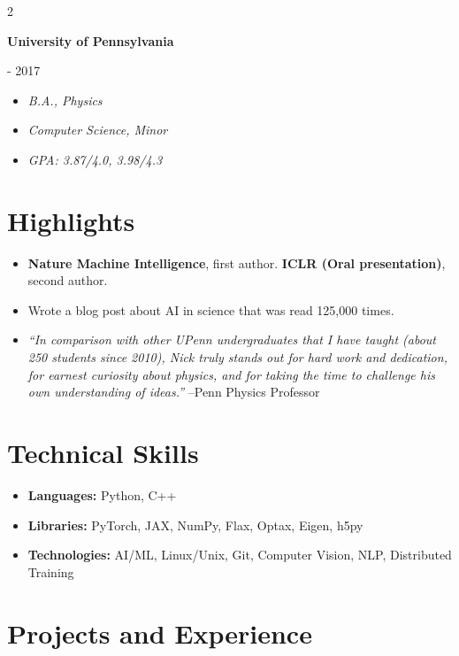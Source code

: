 \documentclass[10pt, letterpaper]{article}
\newenvironment{highlights}{
    \begin{itemize}[
        topsep=0.10 cm,
        parsep=0.10 cm,
        partopsep=0pt,
        itemsep=0pt,
        leftmargin=0.4 cm + 10pt
    ]
}{
    \end{itemize}
} %
\newenvironment{twocolentry}[2][]{
    \onecolentry
    \def\secondColumn{#2}
    \setcolumnwidth{\fill, 4.5 cm}
    \begin{paracol}{2}
}{
    \switchcolumn \raggedleft \secondColumn
    \end{paracol}
    \endonecolentry
} %
\begin{document}
\begin{twocolentry}{2013 - 2017}
    \textbf{University of Pennsylvania}
\end{twocolentry}
\begin{highlights}
    \item \textit{B.A., Physics}
    \item \textit{Computer Science, Minor}
    \item \textit{GPA: 3.87/4.0, 3.98/4.3}
\end{highlights}


\section{Highlights}

    \begin{highlights}
        \item \textbf{Nature Machine Intelligence}, first author. \textbf{ICLR (Oral presentation)}, second author. 
        \item Wrote a blog post about AI in science that was read 125,000 times.
        \item \textit{``In comparison with other UPenn undergraduates that I have taught (about 250 students since 2010), Nick truly stands out for hard work and dedication, for earnest curiosity about physics, and for taking the time to challenge his own understanding of ideas.''} --Penn Physics Professor
    \end{highlights}

\section{Technical Skills}

    \begin{highlights}
        \item \textbf{Languages:} Python, C++
        \item \textbf{Libraries:} PyTorch, JAX, NumPy, Flax, Optax, Eigen, h5py
        \item \textbf{Technologies:} AI/ML, Linux/Unix, Git, Computer Vision, NLP, Distributed Training
    \end{highlights}


\section{Projects and Experience}
\end{document}
